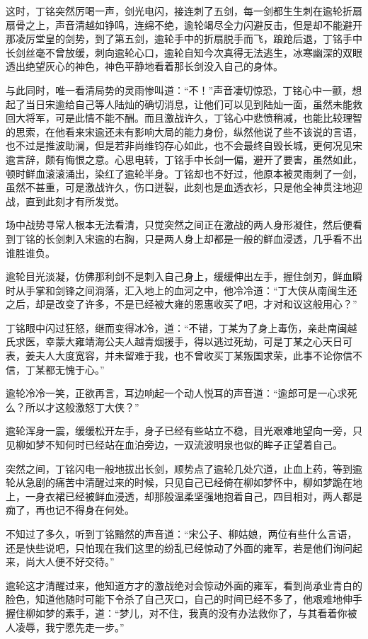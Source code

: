 这时，丁铭突然厉喝一声，剑光电闪，接连刺了五剑，每一剑都生生刺在逾轮折扇扇骨之上，声音清越如铮鸣，连绵不绝，逾轮竭尽全力闪避反击，但是却不能避开那凌厉堂皇的剑势，到了第五剑，逾轮手中的折扇脱手而飞，踉跄后退，丁铭手中长剑丝毫不曾放缓，刺向逾轮心口，逾轮自知今次真得无法逃生，冰寒幽深的双眼透出绝望灰心的神色，神色平静地看着那长剑没入自己的身体。

与此同时，唯一看清局势的灵雨惨叫道：“不！”声音凄切惊恐，丁铭心中一颤，想起了当日宋逾给自己等人陆灿的确切消息，让他们可以见到陆灿一面，虽然未能救回大将军，可是此情不能不酬。而且激战许久，丁铭心中悲愤稍减，也能比较理智的思索，在他看来宋逾还未有影响大局的能力身份，纵然他说了些不该说的言语，也不过是推波助澜，但是若非尚维钧存心如此，也不会最终自毁长城，更何况见宋逾言辞，颇有悔恨之意。心思电转，丁铭手中长剑一偏，避开了要害，虽然如此，顿时鲜血滚滚涌出，染红了逾轮半身。丁铭却也不好过，他原本被灵雨刺了一剑，虽然不甚重，可是激战许久，伤口迸裂，此刻也是血透衣衫，只是他全神贯注地迎战，直到此刻才有所发觉。

场中战势寻常人根本无法看清，只觉突然之间正在激战的两人身形凝住，然后便看到丁铭的长剑刺入宋逾的右胸，只是两人身上却都是一般的鲜血浸透，几乎看不出谁胜谁负。

逾轮目光淡凝，仿佛那利剑不是刺入自己身上，缓缓伸出左手，握住剑刃，鲜血瞬时从手掌和剑锋之间淌落，汇入地上的血河之中，他冷冷道：“丁大侠从南闽生还之后，却是改变了许多，不是已经被大雍的恩惠收买了吧，才对和议这般用心？”

丁铭眼中闪过狂怒，继而变得冰冷，道：“不错，丁某为了身上毒伤，亲赴南闽越氏求医，幸蒙大雍靖海公夫人越青烟援手，得以逃过死劫，可是丁某之心天日可表，姜夫人大度宽容，并未留难于我，也不曾收买丁某叛国求荣，此事不论你信不信，丁某都无愧于心。”

逾轮冷冷一笑，正欲再言，耳边响起一个动人悦耳的声音道：“逾郎可是一心求死么？所以才这般激怒丁大侠？”

逾轮浑身一震，缓缓松开左手，身子已经有些站立不稳，目光艰难地望向一旁，只见柳如梦不知何时已经站在血泊旁边，一双流波明泉也似的眸子正望着自己。

突然之间，丁铭闪电一般地拔出长剑，顺势点了逾轮几处穴道，止血上药，等到逾轮从急剧的痛苦中清醒过来的时候，只见自己已经倚在柳如梦怀中，柳如梦跪在地上，一身衣裙已经被鲜血浸透，却那般温柔坚强地抱着自己，四目相对，两人都是痴了，再也记不得身在何处。

不知过了多久，听到丁铭黯然的声音道：“宋公子、柳姑娘，两位有些什么言语，还是快些说吧，只怕现在我们这里的纷乱已经惊动了外面的雍军，若是他们询问起来，尚大人便不好交待。”

逾轮这才清醒过来，他知道方才的激战绝对会惊动外面的雍军，看到尚承业青白的脸色，知道他随时可能下令杀了自己灭口，自己的时间已经不多了，他艰难地伸手握住柳如梦的素手，道：“梦儿，对不住，我真的没有办法救你了，与其看着你被人凌辱，我宁愿先走一步。”

